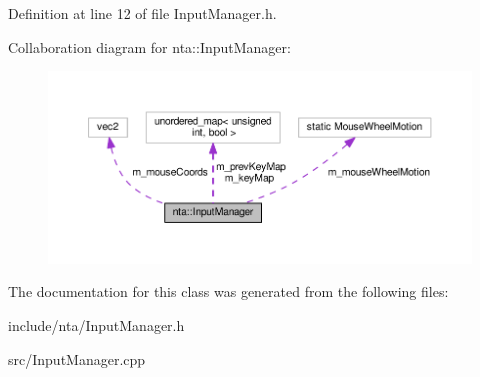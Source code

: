 Definition at line 12 of file Input\+Manager.\+h.



Collaboration diagram for nta\+:\+:Input\+Manager\+:\nopagebreak
\begin{figure}[H]
\begin{center}
\leavevmode
\includegraphics[width=350pt]{dc/d97/classnta_1_1InputManager__coll__graph}
\end{center}
\end{figure}


The documentation for this class was generated from the following files\+:\begin{DoxyCompactItemize}
\item 
include/nta/Input\+Manager.\+h\item 
src/Input\+Manager.\+cpp\end{DoxyCompactItemize}
